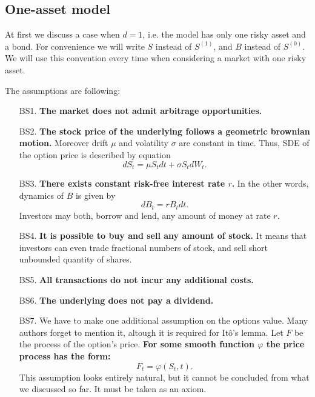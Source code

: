 \documentclass[a4paper,11pt, twoside]{book}
\theoremstyle{definition}
\theoremstyle{remark}
\begin{document}
\subsection{One-asset model}
At first we discuss a case when $d=1$, i.e. the model has only one risky asset and a bond. For convenience we will write $S$ instead of $S^{(1)}$, and $B$ instead of $S^{(0)}$. We will use this convention every time when considering a market with one risky asset.

The assumptions are following:
\begin{enumerate}
  \item[BS1.] \textbf{The market does not admit arbitrage opportunities.}

 \item[BS2.] \textbf{The stock price of the underlying follows a geometric brownian motion.} Moreover drift $\mu$ and volatility $\sigma$ are constant in time. Thus, SDE of the option price is described by equation
\begin{equation}
 \label{eq:BS_dynamics}
 dS_t = \mu S_t dt + \sigma S_t dW_t. 
\end{equation}
 
  \item[BS3.] \textbf{There exists constant risk-free interest rate $r$.} In the other words, dynamics of $B$ is given by 
\[ dB_t = rB_t dt. \]
Investors may both, borrow and lend, any amount of money at rate $r$.

  \item[BS4.] \textbf{It is possible to buy and sell any amount of stock.} It means that investors can even trade fractional numbers of stock, and sell short unbounded quantity of shares.

  \item[BS5.] \textbf{All transactions do not incur any additional costs.}

  \item[BS6.] \textbf{The underlying does not pay a dividend.}
  
  \item[BS7.] We have to make one additional assumption on the options value. Many authors forget to mention it, altough it is required for It\^{o}'s lemma. Let $F$ be the process of the option's price\footnotemark.
  \textbf{For some smooth function $\varphi$ the price process has the form:}
    \begin{equation}
    \label{eq:PriceProcessForm}
    F_t = \varphi(S_t, t).
    \end{equation}
This assumption looks entirely natural, but it cannot be concluded from what we discussed so far. It must be taken as an axiom.
\end{enumerate}
\end{document}
